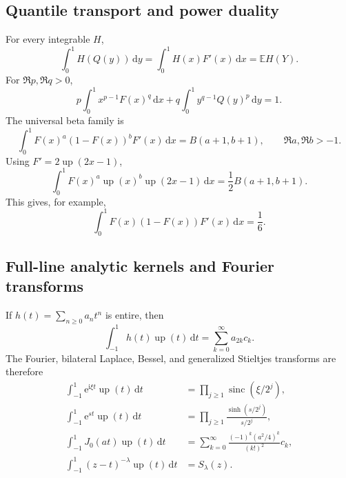 \documentclass[11pt,oneside]{article}
\numberwithin{equation}{section}
\theoremstyle{plain}
\theoremstyle{definition}
\theoremstyle{remark}
\newcommand{\E}{\mathbb E}
\newcommand{\Up}{\operatorname{up}}
\newcommand{\sinc}{\operatorname{sinc}}
\newcommand{\dd}{\,\mathrm d}
\newcommand{\e}{\mathrm e}
\newcommand{\ii}{\mathrm i}
\begin{document}
\subsection{Quantile transport and power duality}

For every integrable $H$,
\begin{equation}
 \int_0^1H(Q(y))\dd y
 =\int_0^1H(x)F'(x)\dd x
 =\E H(Y).
 \label{eq:quantile-transport}
\end{equation}
For $\Re p,\Re q>0$,
\begin{equation}
 p\int_0^1x^{p-1}F(x)^q\dd x
 +q\int_0^1y^{q-1}Q(y)^p\dd y=1.
 \label{eq:power-duality}
\end{equation}
The universal beta family is
\begin{equation}
 \int_0^1F(x)^a(1-F(x))^bF'(x)\dd x
 =B(a+1,b+1),
 \qquad \Re a,\Re b>-1.
 \label{eq:universal-beta}
\end{equation}
Using $F'=2\Up(2x-1)$,
\begin{equation}
 \int_0^1F(x)^a\Up(x)^b\Up(2x-1)\dd x
 =\frac12B(a+1,b+1).
 \label{eq:up-beta-combination}
\end{equation}
This gives, for example,
\begin{equation}
 \int_0^1F(x)(1-F(x))F'(x)\dd x=\frac16.
 \label{eq:F-survival-density}
\end{equation}

\subsection{Full-line analytic kernels and Fourier transforms}

If $h(t)=\sum_{n\ge0}a_nt^n$ is entire, then
\begin{equation}
 \int_{-1}^1h(t)\Up(t)\dd t
 =\sum_{k=0}^{\infty}a_{2k}c_k.
 \label{eq:entire-kernel-up}
\end{equation}
The Fourier, bilateral Laplace, Bessel, and generalized Stieltjes transforms
are therefore
\begin{align}
 \int_{-1}^1\e^{\ii\xi t}\Up(t)\dd t
 &=\prod_{j\ge1}\sinc(\xi/2^j),
 \label{eq:Fourier-up-catalog}\\
 \int_{-1}^1\e^{st}\Up(t)\dd t
 &=\prod_{j\ge1}\frac{\sinh(s/2^j)}{s/2^j},
 \label{eq:bilateral-Laplace-up}\\
 \int_{-1}^1J_0(at)\Up(t)\dd t
 &=\sum_{k=0}^{\infty}
   \frac{(-1)^k(a^2/4)^k}{(k!)^2}c_k,
 \label{eq:Bessel-up}\\
 \int_{-1}^1(z-t)^{-\lambda}\Up(t)\dd t
 &=S_\lambda(z).
 \label{eq:Stieltjes-catalog}
\end{align}
\end{document}
